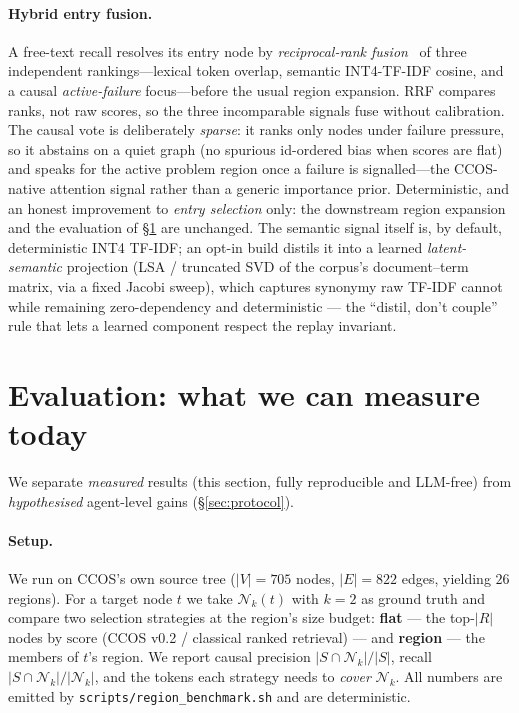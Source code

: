 \documentclass[11pt]{article}
\newcommand{\Nk}{\mathcal{N}_k}
\newcommand{\code}[1]{\texttt{#1}}
\begin{document}
\paragraph{Hybrid entry fusion.} A free-text recall resolves its entry node by
\emph{reciprocal-rank fusion}~\cite{cormack2009reciprocal} of three independent
rankings---lexical token overlap, semantic INT4-TF-IDF cosine, and a causal
\emph{active-failure} focus---before the usual region expansion. RRF compares
ranks, not raw scores, so the three incomparable signals fuse without
calibration. The causal vote is deliberately \emph{sparse}: it ranks only nodes
under failure pressure, so it abstains on a quiet graph (no spurious id-ordered
bias when scores are flat) and speaks for the active problem region once a failure
is signalled---the CCOS-native attention signal rather than a generic importance
prior. Deterministic, and an honest improvement to \emph{entry selection} only:
the downstream region expansion and the evaluation of \S\ref{sec:eval} are
unchanged. The semantic signal itself is, by default, deterministic INT4 TF-IDF;
an opt-in build distils it into a learned \emph{latent-semantic} projection (LSA /
truncated SVD of the corpus's document--term matrix, via a fixed Jacobi sweep),
which captures synonymy raw TF-IDF cannot while remaining zero-dependency and
deterministic --- the ``distil, don't couple'' rule that lets a learned component
respect the replay invariant.

\section{Evaluation: what we can measure today}\label{sec:eval}

We separate \emph{measured} results (this section, fully reproducible and
LLM-free) from \emph{hypothesised} agent-level gains (\S\ref{sec:protocol}).

\paragraph{Setup.} We run on CCOS's own source tree
($|V|=705$ nodes, $|E|=822$ edges, yielding $26$ regions). For a target node $t$
we take $\Nk(t)$ with $k=2$ as ground truth and compare two selection strategies
at the region's size budget: \textbf{flat} --- the top-$|R|$ nodes by
$\mathrm{score}$ (CCOS v0.2 / classical ranked retrieval) --- and \textbf{region}
--- the members of $t$'s region. We report causal precision $|S\cap\Nk|/|S|$,
recall $|S\cap\Nk|/|\Nk|$, and the tokens each strategy needs to \emph{cover}
$\Nk$. All numbers are emitted by \code{scripts/region\_benchmark.sh} and are
deterministic.
\end{document}
